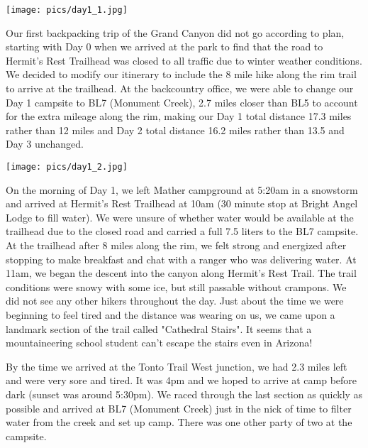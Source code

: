 \documentclass[10pt,a4paper]{article}
\newenvironment{Figure}
  {\par\medskip\noindent\minipage{\linewidth}}
  {\endminipage\par\medskip}
\begin{document}
\begin{multicols}{2}
\begin{Figure}
 \centering
 \texttt{[image: pics/day1\_1.jpg]}
\end{Figure}

Our first backpacking trip of the Grand Canyon did not go according to plan, starting with Day 0 when we arrived at the park to find that the road to Hermit's Rest Trailhead was closed to all traffic due to winter weather conditions. We decided to modify our itinerary to include the 8 mile hike along the rim trail to arrive at the trailhead. At the backcountry office, we were able to change our Day 1 campsite to BL7 (Monument Creek), 2.7 miles closer than BL5 to account for the extra mileage along the rim, making our Day 1 total distance 17.3 miles rather than 12 miles and Day 2 total distance 16.2 miles rather than 13.5 and Day 3 unchanged. \\

\begin{Figure}
 \centering
 \texttt{[image: pics/day1\_2.jpg]}
\end{Figure}

On the morning of Day 1, we left Mather campground at 5:20am in a snowstorm and arrived at Hermit's Rest Trailhead at 10am (30 minute stop at Bright Angel Lodge to fill water). We were unsure of whether water would be available at the trailhead due to the closed road and carried a full 7.5 liters to the BL7 campsite. At the trailhead after 8 miles along the rim, we felt strong and energized after stopping to make breakfast and chat with a ranger who was delivering water. At 11am, we began the descent into the canyon along Hermit's Rest Trail. The trail conditions were snowy with some ice, but still passable without crampons. We did not see any other hikers throughout the day. Just about the time we were beginning to feel tired and the distance was wearing on us, we came upon a landmark section of the trail called "Cathedral Stairs". It seems that a mountaineering school student can't escape the stairs even in Arizona! 


By the time we arrived at the Tonto Trail West junction, we had 2.3 miles left and were very sore and tired. It was 4pm and we hoped to arrive at camp before dark (sunset was around 5:30pm). We raced through the last section as quickly as possible and arrived at BL7 (Monument Creek) just in the nick of time to filter water from the creek and set up camp. There was one other party of two at the campsite.


\end{multicols}
\end{document}
